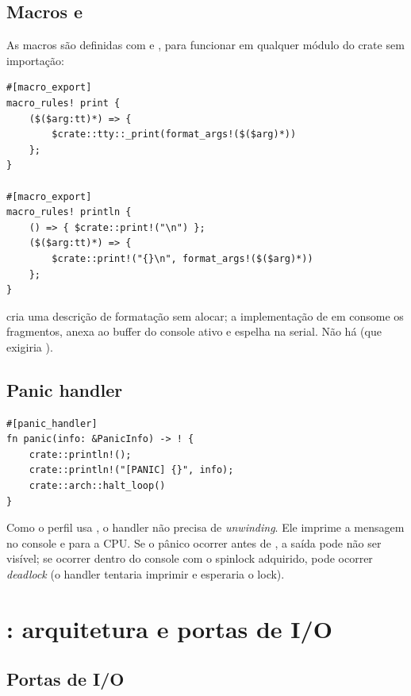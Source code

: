 \subsection{Macros  e }

As macros s\~ao definidas com  e , para
funcionar em qualquer m\'odulo do crate sem importa\c{c}\~ao:

\begin{lstlisting}[caption={Macros de impress\~ao sem aloca\c{c}\~ao.},label={lst:macros}]
#[macro_export]
macro_rules! print {
    ($($arg:tt)*) => {
        $crate::tty::_print(format_args!($($arg)*))
    };
}

#[macro_export]
macro_rules! println {
    () => { $crate::print!("\n") };
    ($($arg:tt)*) => {
        $crate::print!("{}\n", format_args!($($arg)*))
    };
}
\end{lstlisting}

 cria uma descri\c{c}\~ao de formata\c{c}\~ao sem alocar;
a implementa\c{c}\~ao de  em  consome os
fragmentos, anexa ao buffer do console ativo e espelha na serial.
N\~ao h\'a  (que exigiria ).

\subsection{Panic handler}

\begin{lstlisting}[caption={\emph{Panic handler} do kernel.},label={lst:panic}]
#[panic_handler]
fn panic(info: &PanicInfo) -> ! {
    crate::println!();
    crate::println!("[PANIC] {}", info);
    crate::arch::halt_loop()
}
\end{lstlisting}

Como o perfil usa , o handler n\~ao precisa de
\emph{unwinding}. Ele imprime a mensagem no console e para a CPU. Se o
p\^anico ocorrer antes de , a sa\'ida pode n\~ao ser
vis\'ivel; se ocorrer dentro do console com o spinlock adquirido, pode
ocorrer \emph{deadlock} (o handler tentaria imprimir e esperaria o lock).

\section{: arquitetura e portas de I/O}

\subsection{Portas de I/O}

